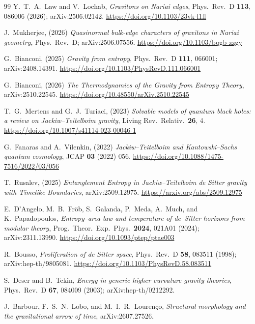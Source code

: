 \documentclass[11pt]{article}
\begin{document}
\begin{thebibliography}{99}
 Y.~T.~A.~Law and V.~Lochab, \emph{Gravitons on Nariai edges}, Phys.\ Rev.\ D \textbf{113}, 086006 (2026); arXiv:2506.02142.
\url{https://doi.org/10.1103/23vk-l1fl}

 J.~Mukherjee, (2026) \emph{Quasinormal bulk-edge characters of gravitons in Nariai geometry}, Phys.\ Rev.\ D; arXiv:2506.07556.
\url{https://doi.org/10.1103/bqgb-zzgy}

 G.~Bianconi, (2025) \emph{Gravity from entropy}, Phys.\ Rev.\ D \textbf{111}, 066001; arXiv:2408.14391. \url{https://doi.org/10.1103/PhysRevD.111.066001}

 G.~Bianconi, (2026) \emph{The Thermodynamics of the Gravity from Entropy Theory}, arXiv:2510.22545.
\newline \url{https://doi.org/10.48550/arXiv.2510.22545}

 T.~G.~Mertens and G.~J.~Turiaci, (2023) \emph{Solvable models of quantum black holes: a review on Jackiw--Teitelboim gravity}, Living Rev.\ Relativ.\ \textbf{26}, 4.
\url{https://doi.org/10.1007/s41114-023-00046-1}

 G.~Fanaras and A.~Vilenkin, (2022) \emph{Jackiw--Teitelboim and Kantowski--Sachs quantum cosmology}, JCAP \textbf{03} (2022) 056.
\url{https://doi.org/10.1088/1475-7516/2022/03/056}

 T.~Rusalev, (2025) \emph{Entanglement Entropy in Jackiw--Teitelboim de Sitter gravity with Timelike Boundaries}, arXiv:2509.12975. \url{https://arxiv.org/abs/2509.12975}


 E.~D'Angelo, M.~B.~Fr\"ob, S.~Galanda, P.~Meda, A.~Much, and K.~Papadopoulos, \emph{Entropy--area law and temperature of de~Sitter horizons from modular theory}, Prog.\ Theor.\ Exp.\ Phys.\ \textbf{2024}, 021A01 (2024); arXiv:2311.13990. \url{https://doi.org/10.1093/ptep/ptae003}

 R.~Bousso, \emph{Proliferation of de Sitter space}, Phys.\ Rev.\ D \textbf{58}, 083511 (1998); arXiv:hep-th/9805081. \url{https://doi.org/10.1103/PhysRevD.58.083511}

 S.~Deser and B.~Tekin, \emph{Energy in generic higher curvature gravity theories}, Phys.\ Rev.\ D \textbf{67}, 084009 (2003); arXiv:hep-th/0212292.

 J.~Barbour, F.~S.~N.~Lobo, and M.~I.~R.~Louren\c{c}o, \emph{Structural morphology and the gravitational arrow of time}, arXiv:2607.27526.


\end{thebibliography}
\end{document}
